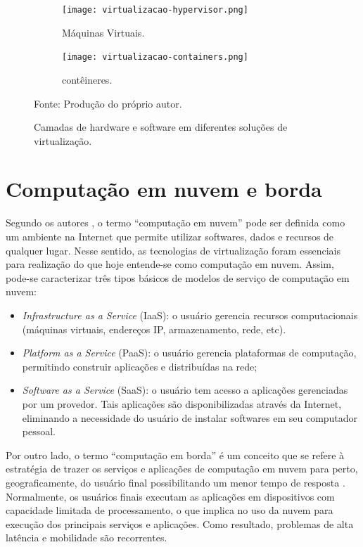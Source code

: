 \begin{figure}[ht]
    \centering
    \begin{subfigure}[b]{0.45\textwidth}
        \centering
        \texttt{[image: virtualizacao-hypervisor.png]}
        \caption{Máquinas Virtuais.}
        \label{fig:virtualizacao-hypervisor}
    \end{subfigure}
    \hspace{1mm}
    \begin{subfigure}[b]{0.45\textwidth}
        \centering
        \texttt{[image: virtualizacao-containers.png]}
        \caption{contêineres.}
        \label{fig:virtualizacao-containers}
    \end{subfigure}
    \caption{Camadas de hardware e software em diferentes soluções de virtualização.}
    \footnotesize Fonte: Produção do próprio autor.
    \label{fig:virtualizacao-camadas-containers-e-hypervisor}
\end{figure}

\section{Computação em nuvem e borda}

Segundo os autores , o termo ``computação em nuvem'' pode ser definida como um ambiente na Internet que permite utilizar softwares, dados e recursos de qualquer lugar. Nesse sentido, as tecnologias de virtualização foram essenciais para realização do que hoje entende-se como computação em nuvem. Assim, pode-se caracterizar três tipos básicos de modelos de serviço de computação em nuvem:
\begin{itemize}
    \item \textit{Infrastructure as a Service} (IaaS): o usuário gerencia recursos computacionais (máquinas virtuais, endereços IP, armazenamento, rede, etc).
    \item \textit{Platform as a Service} (PaaS): o usuário gerencia plataformas de computação, permitindo construir aplicações e distribuídas na rede;
    \item \textit{Software as a Service} (SaaS): o usuário tem acesso a aplicações gerenciadas por um provedor. Tais aplicações são disponibilizadas através da Internet, eliminando a necessidade do usuário de instalar softwares em seu computador pessoal.
\end{itemize}

Por outro lado, o termo ``computação em borda'' é um conceito que se refere à estratégia de trazer os serviços e aplicações de computação em nuvem para perto, geograficamente, do usuário final possibilitando um menor tempo de resposta \cite{khan2019edge}. Normalmente, os usuários finais executam as aplicações em dispositivos com capacidade limitada de processamento, o que implica no uso da nuvem para execução dos principais serviços e aplicações. Como resultado, problemas de alta latência e mobilidade são recorrentes.

